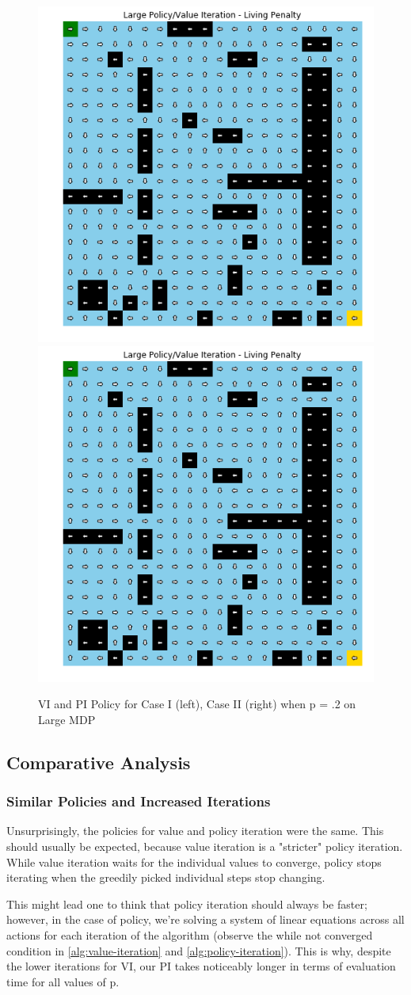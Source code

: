 \documentclass[letter]{article}
\begin{document}
\begin{figure}[]
    \centering
    \includegraphics[width=.4\linewidth]{largeLivingPenaltyPolicy.png}
    \includegraphics[width=.4\linewidth]{largeDiscountedPolicy.png}
    \caption{VI and PI Policy for Case I (left), Case II (right) when p = .2 on Large MDP}
    \label{largePolicies}
\end{figure}


\subsection{Comparative Analysis}

\subsubsection{Similar Policies and Increased Iterations}
Unsurprisingly, the policies for value and policy iteration were the same. This should usually be expected, because value iteration is a "stricter" policy iteration. While value iteration waits for the individual values to converge, policy stops iterating when the greedily picked individual steps stop changing. 

This might lead one to think that policy iteration should always be faster; however, in the case of policy, we're solving a system of linear equations across all actions for each iteration of the algorithm (observe the while not converged condition in \ref{alg:value-iteration} and \ref{alg:policy-iteration}). This is why, despite the lower iterations for VI, our PI takes noticeably longer in terms of evaluation time for all values of p.
\end{document}
